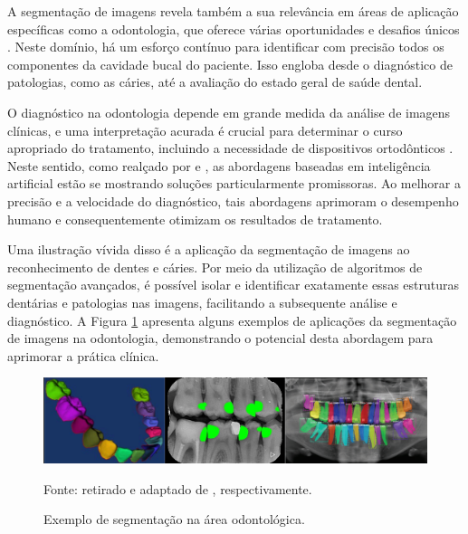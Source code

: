 A segmentação de imagens revela também a sua relevância em áreas de aplicação específicas como a odontologia, que oferece várias oportunidades e desafios únicos \citep{Ghazvinian2021,Minyoung2020}. Neste domínio, há um esforço contínuo para identificar com precisão todos os componentes da cavidade bucal do paciente. Isso engloba desde o diagnóstico de patologias, como as cáries, até a avaliação do estado geral de saúde dental.

O diagnóstico na odontologia depende em grande medida da análise de imagens clínicas, e uma interpretação acurada é crucial para determinar o curso apropriado do tratamento, incluindo a necessidade de dispositivos ortodônticos \citep{Schwendicke2020}. Neste sentido, como realçado por \cite{Bansal2021, Nguyen2021} e \cite{Schwendicke2020}, as abordagens baseadas em inteligência artificial estão se mostrando soluções particularmente promissoras. Ao melhorar a precisão e a velocidade do diagnóstico, tais abordagens aprimoram o desempenho humano e consequentemente otimizam os resultados de tratamento.

Uma ilustração vívida disso é a aplicação da segmentação de imagens ao reconhecimento de dentes e cáries. Por meio da utilização de algoritmos de segmentação avançados, é possível isolar e identificar exatamente essas estruturas dentárias e patologias nas imagens, facilitando a subsequente análise e diagnóstico. A Figura \ref{intro:fig:4} apresenta alguns exemplos de aplicações da segmentação de imagens na odontologia, demonstrando o potencial desta abordagem para aprimorar a prática clínica.

\begin{figure}[H]
    \centering
    \caption{Exemplo de segmentação na área odontológica.}
    \includegraphics[width=1\linewidth]{recursos/imagens/introduction/odonto_segmentation.png}
    \label{intro:fig:4}

    Fonte: retirado e adaptado de \cite{Shuai2016,Bayrakdar2021,Gil2019}, respectivamente.
\end{figure}

